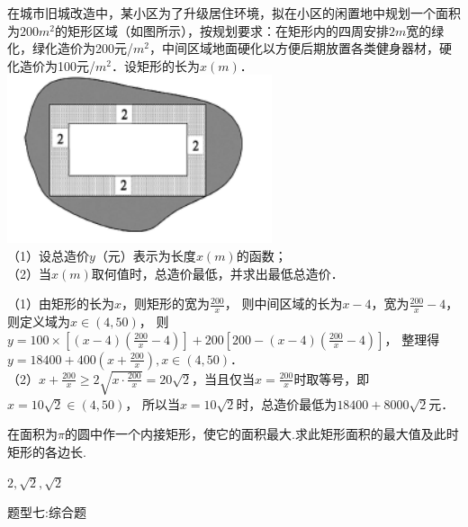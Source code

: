 \documentclass[11pt,a4paper]{ctexbook}
\begin{document}
\par
\begin{problem}
    在城市旧城改造中，某小区为了升级居住环境，拟在小区的闲置地中规划一个面积为$200m^2$的矩形区域（如图所示），按规划要求：在矩形内的四周安排$2m$宽的绿化，绿化造价为200元/$m^2$，中间区域地面硬化以方便后期放置各类健身器材，硬化造价为100元/$m^2$．设矩形的长为$x(m)$．\\
    \includegraphics[scale=1.0]{pictures/image1.png}\\
    （1）设总造价$y$（元）表示为长度$x(m)$的函数；\\
    （2）当$x(m)$取何值时，总造价最低，并求出最低总造价．\\
    \begin{jiexi}
        （1）由矩形的长为$x$，则矩形的宽为$\displaystyle \frac{200}{x}$，
则中间区域的长为$x-4$，宽为$\displaystyle \frac{200}{x}-4$，则定义域为$x\in(4,50)$，
则$\displaystyle y=100\times[(x-4)(\frac{200}{x}-4)]+200[200-(x-4)(\frac{200}{x}-4)]$，
整理得$\displaystyle y=18400+400(x+\frac{200}{x}),x\in(4,50)$．\\
（2）$\displaystyle x+\frac{200}{x}\ge 2\sqrt{x\cdot\frac{200}{x}}=20\sqrt{2}$，当且仅当$\displaystyle x=\frac{200}{x}$时取等号，即$x=10\sqrt{2}\in (4,50)$，
所以当$x=10\sqrt{2}$时，总造价最低为$18400+8000\sqrt{2}$元．
    \end{jiexi}
\end{problem}



\par
\begin{problem}
    在面积为$\pi$的圆中作一个内接矩形，使它的面积最大.求此矩形面积的最大值及此时矩形的各边长.
    \begin{jiexi}
        $2,\sqrt{2},\sqrt{2}$
    \end{jiexi}
\end{problem}


\begin{tcolorbox} 
    \centering
题型七:综合题
\end{tcolorbox}
\end{document}
